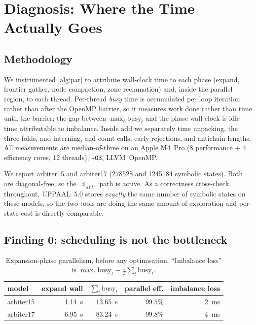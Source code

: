 \section{Diagnosis: Where the Time Actually Goes}\label{sec:diagnosis}

\subsection{Methodology}

We instrumented \cref{alg:par} to attribute wall-clock time to each phase
(expand, frontier gather, node compaction, zone reclamation) and, inside the
parallel region, to each thread.  Per-thread \emph{busy} time is accumulated per
loop iteration rather than after the OpenMP barrier, so it measures work done
rather than time until the barrier; the gap between $\max_t \mathrm{busy}_t$ and
the phase wall-clock is idle time attributable to imbalance.  Inside
$\mathrm{add}$ we separately time unpacking, the three folds, and interning, and
count calls, early rejections, and antichain lengths.  All measurements are
median-of-three on an Apple M4~Pro (8 performance + 4 efficiency cores, 12
threads), \texttt{-O3}, LLVM~OpenMP.

We report arbiter15 and arbiter17 (\num{278528} and \num{1245184} symbolic
states).  Both are diagonal-free, so the $\preceq_{aLU}$ path is active.  As a
correctness cross-check throughout, UPPAAL~5.0 stores \emph{exactly} the same
number of symbolic states on these models, so the two tools are doing the same
amount of exploration and per-state cost is directly comparable.

\subsection{Finding 0: scheduling is not the bottleneck}

\begin{table}[t]
\centering
\caption{Expansion-phase parallelism, before any optimisation.  ``Imbalance
loss'' is $\max_t \mathrm{busy}_t - \tfrac{1}{T}\sum_t \mathrm{busy}_t$.}
\label{tab:balance}
\begin{tabular}{lrrrr}
\toprule
model & expand wall & $\sum_t \mathrm{busy}_t$ & parallel eff. & imbalance loss \\
\midrule
arbiter15 & \SI{1.14}{\second} & \SI{13.65}{\second} & $99.5\%$ & \SI{2}{\milli\second} \\
arbiter17 & \SI{6.95}{\second} & \SI{83.24}{\second} & $99.8\%$ & \SI{4}{\milli\second} \\
\bottomrule
\end{tabular}
\end{table}

